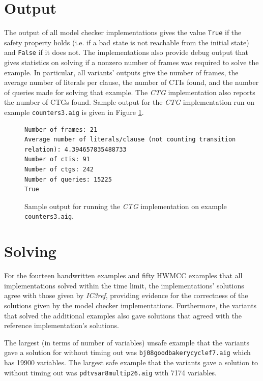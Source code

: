 \documentclass[12pt,a4paper,twoside,openright]{report}
\begin{document}
{\section{Output}
\label{eval:output}

The output of all model checker implementations gives the value \verb,True, if the safety
property holds (i.e. if a bad state is not reachable from the initial state) and
\verb,False, if it does not. The implementations also provide debug output that gives
statistics on solving if a nonzero number of frames was required to solve the example.
In particular, all variants' outputs give the number of frames, the average number of
literals per clause, the number of CTIs found, and the number of queries made for solving
that example. The {\it CTG} implementation also reports the number of CTGs found. Sample output
for the {\it CTG} implementation run on example \verb,counters3.aig,
is given in Figure \ref{sampleoutput}.

\begin{figure}[t]
\centering
\begin{lstlisting}[keywordstyle = \ttfamily, basicstyle = \footnotesize\ttfamily]
Number of frames: 21
Average number of literals/clause (not counting transition relation): 4.394657835488733
Number of ctis: 91
Number of ctgs: 242
Number of queries: 15225
True
\end{lstlisting}
\caption{Sample output for running the {\it CTG} implementation on example {\tt counters3.aig}.}
\label{sampleoutput}
\end{figure}

\section{Solving}
\label{eval:solving}

For the fourteen handwritten examples and fifty HWMCC examples that all implementations solved
within the time limit, the
implementations' solutions agree with those given by \emph{IC3ref}, providing evidence for the correctness of the solutions given by the model checker
implementations. Furthermore, the variants that solved the additional examples also gave
solutions that agreed with the reference implementation's solutions.

The largest (in terms of number of variables) unsafe example that the variants gave a solution
for without timing out was \verb,bj08goodbakerycyclef7.aig, which has 19900 variables.
The largest safe example that the variants gave a solution
to without timing out was \verb,pdtvsar8multip26.aig, with 7174 variables.

}
\end{document}
